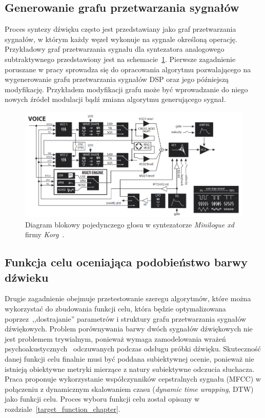 \subsection{Generowanie grafu przetwarzania sygnałów}

Proces syntezy dźwięku często jest przedstawiany jako graf przetwarzania sygnałów, w którym
każdy węzeł wykonuje na sygnale określoną operację.
Przykładowy graf przetwarzania sygnału dla syntezatora analogowego subtraktywnego
przedstawiony jest na schemacie~\ref{fig:minilogue_diagram}.
Pierwsze zagadnienie poruszane w pracy sprowadza się do opracowania algorytmu pozwalającego na wygenerowanie
grafu przetwarzania sygnałów DSP oraz jego późniejszą modyfikację. Przykładem modyfikacji grafu
może być wprowadzanie do niego nowych źródeł modulacji bądź zmiana algorytmu generującego sygnał.

\begin{figure}[H]
    \centering
    \includegraphics[width=0.8\linewidth]{rys01/minilogue_voice_block_diagram.png}
    \caption{
      Diagram blokowy pojedynczego głosu w syntezatorze 
      \textit{Minilogue xd} firmy \textit{Korg}~\cite{minilogue_diagram}.
    }\label{fig:minilogue_diagram}
\end{figure}

\subsection{Funkcja celu oceniająca podobieństwo barwy dźwieku}

Drugie zagadnienie obejmuje przetestowanie szeregu algorytmów, które można
wykorzystać do zbudowania funkcji celu, która będzie optymalizowana
poprzez~,,dostrajanie'' parametrów i struktury grafu przetwarzania sygnałów dźwiękowych.
Problem porównywania barwy dwóch sygnałów dźwiękowych nie jest problemem trywialnym,
ponieważ wymaga zamodelowania wrażeń psychoakustycznych~\cite{engel2020ddsp} odczuwanych
podczas odsługu próbki dźwięku.
Skuteczność danej funkcji celu finalnie musi być poddana subiektywnej ocenie,
ponieważ nie istnieją obiektywne metryki mierzące z natury subiektywne odczucia słuchacza.
Praca proponuje wykorzystanie współczynników cepstralnych sygnału (MFCC) w połączeniu
z dynamicznym skalowaniem czasu (\textit{dynamic time wrapping}, DTW) jako funkcji celu.
Proces wyboru funkcji celu został
opisany w rozdziale~\ref{target_function_chapter}.

